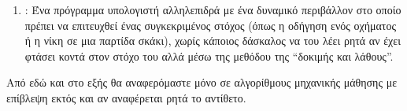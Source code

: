 \begin{enumerate}
    \item {}:
          Ένα πρόγραμμα υπολογιστή αλληλεπιδρά με ένα δυναμικό περιβάλλον στο οποίο πρέπει να επιτευχθεί ένας συγκεκριμένος στόχος (όπως η οδήγηση ενός οχήματος ή η νίκη σε μια παρτίδα σκάκι),
          χωρίς κάποιος δάσκαλος να του λέει ρητά αν έχει φτάσει κοντά στον στόχο του αλλά μέσω της μεθόδου της \enquote{δοκιμής και λάθους}.
\end{enumerate}

Από εδώ και στο εξής θα αναφερόμαστε μόνο σε αλγορίθμους μηχανικής μάθησης με επίβλεψη εκτός και αν αναφέρεται ρητά το αντίθετο.




